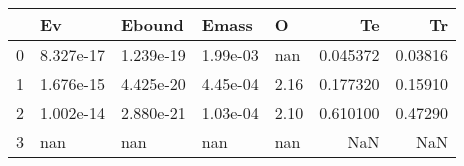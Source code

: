 \begin{tabular}{lllllrr}
\toprule
{} &         Ev &     Ebound &     Emass &     O &        Te &       Tr \\
\midrule
0 &  8.327e-17 &  1.239e-19 &  1.99e-03 &   nan &  0.045372 &  0.03816 \\
1 &  1.676e-15 &  4.425e-20 &  4.45e-04 &  2.16 &  0.177320 &  0.15910 \\
2 &  1.002e-14 &  2.880e-21 &  1.03e-04 &  2.10 &  0.610100 &  0.47290 \\
3 &        nan &        nan &       nan &   nan &       NaN &      NaN \\
\bottomrule
\end{tabular}
